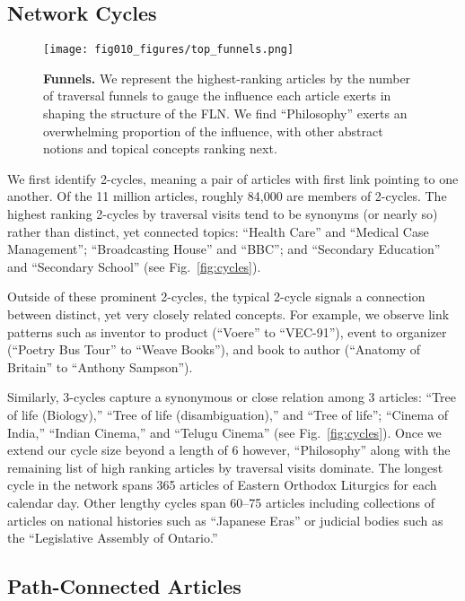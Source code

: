 \documentclass[pre,twocolumn,twoside,superscriptaddress,floatfix]{revtex4-1}
\begin{document}
{\subsection{Network Cycles}
\label{cycles}
\begin{figure}[tp!]
  \texttt{[image: fig010\_figures/top\_funnels.png]}
  \caption{
    \textbf{Funnels.}
We represent the highest-ranking articles by the number of traversal 
funnels to gauge the influence each article exerts in shaping the 
structure of the FLN. 
We find ``Philosophy'' exerts an overwhelming proportion
of the influence, with other abstract notions and topical concepts ranking
next.}
  \label{fig:Funnels}
\end{figure}

We first identify 2-cycles, meaning a pair of articles with first link pointing to one another.
Of the 11 million articles, roughly 84,000 are members of 2-cycles. 
The highest ranking 2-cycles by traversal visits tend to be synonyms (or nearly so) rather than distinct, yet connected topics:
``Health Care'' and ``Medical Case Management''; ``Broadcasting House'' and ``BBC''; and ``Secondary Education'' and ``Secondary School'' 
(see Fig.~\ref{fig:cycles}).

Outside of these prominent 2-cycles, the typical 2-cycle signals a connection between distinct, yet very closely related concepts. 
For example, we observe link patterns such as inventor to product (``Voere'' to ``VEC-91''), event to organizer (``Poetry Bus Tour'' to ``Weave Books''), and book to author (``Anatomy of Britain'' to ``Anthony Sampson'').

Similarly, 3-cycles capture a synonymous or close relation among 3 articles: ``Tree of life (Biology),'' ``Tree of life (disambiguation),'' 
and ``Tree of life''; ``Cinema of India,'' ``Indian Cinema,'' and ``Telugu Cinema''
(see Fig.~\ref{fig:cycles}).
Once we extend our cycle size beyond a length of 6 however, 
``Philosophy'' along with the remaining list of high ranking articles by traversal visits dominate.
The longest cycle in the network spans 365 articles of Eastern Orthodox Liturgics for each calendar day.
Other lengthy cycles span 60--75 articles including collections of articles on national histories such as ``Japanese Eras'' 
or judicial bodies such as the ``Legislative Assembly of Ontario.''

\subsection{Path-Connected Articles}

}
\end{document}
